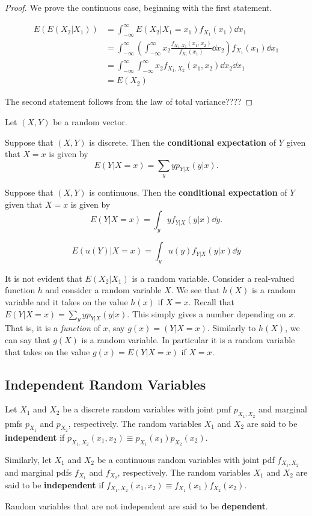 \begin{proof}
	We prove the continuous case, beginning with the first statement.

	\begin{align*}
		E(E(X_2|X_1))&=\int_{-\infty}^{\infty}E(X_2|X_1=x_1)f_{X_1}(x_1)\dd{x_1}\\
		&=\int_{-\infty}^{\infty}\left(\int_{-\infty}^\infty x_2\frac{f_{X_1,X_2}(x_1,x_2)}{f_{X_1}(x_1)}\dd{x_2}\right)f_{X_1}(x_1)\dd{x_1}\\
		&=\int_{-\infty}^{\infty}\int_{-\infty}^\infty x_2f_{X_1,X_2}(x_1,x_2)\dd{x_2}\dd{x_1}\\
		&=E(X_2)
	\end{align*}

	The second statement follows from the law of total variance????
\end{proof}

\begin{definition}
	Let $(X,Y)$ be a random vector.

	Suppose that $(X,Y)$ is discrete. Then the \textbf{conditional expectation} of $Y$ given that $X=x$ is given by
	$$E(Y|X=x)=\sum_yyp_{Y|X}(y|x).$$

	Suppose that $(X,Y)$ is continuous. Then the \textbf{conditional expectation} of $Y$ given that $X=x$ is given by
	$$E(Y|X=x)=\int_yyf_{Y|X}(y|x)\dd y.$$

	$$E(u(Y)|X=x)=\int_yu(y)f_{Y|X}(y|x)\dd y$$
\end{definition}

It is not evident that $E(X_2|X_1)$ is a random variable. Consider a real-valued function $h$ and consider a random variable $X$. We see that $h(X)$ is a random variable and it takes on the value $h(x)$ if $X=x$. Recall that $E(Y|X=x)=\sum_yyp_{Y|X}(y|x)$. This simply gives a number depending on $x$. That is, it is a \textit{function} of $x$, say $g(x)=(Y|X=x)$. Similarly to $h(X)$, we can say that $g(X)$ is a random variable. In particular it is a random variable that takes on the value $g(x)=E(Y|X=x)$ if $X=x$.

\subsection{Independent Random Variables}

\begin{definition}[independence]
	Let $X_1$ and $X_2$ be a discrete random variables with joint pmf $p_{X_1,X_2}$ and marginal pmfs $p_{X_1}$ and $p_{X_2}$, respectively. The random variables $X_1$ and $X_2$ are said to be \textbf{independent} if $p_{X_1,X_2}(x_1,x_2)\equiv p_{X_1}(x_1)p_{X_2}(x_2)$.

	Similarly, let $X_1$ and $X_2$ be a continuous random variables with joint pdf $f_{X_1,X_2}$ and marginal pdfs $f_{X_1}$ and $f_{X_2}$, respectively. The random variables $X_1$ and $X_2$ are said to be \textbf{independent} if $f_{X_1,X_2}(x_1,x_2)\equiv f_{X_1}(x_1)f_{X_2}(x_2)$.

	Random variables that are not independent are said to be \textbf{dependent}.
\end{definition}

